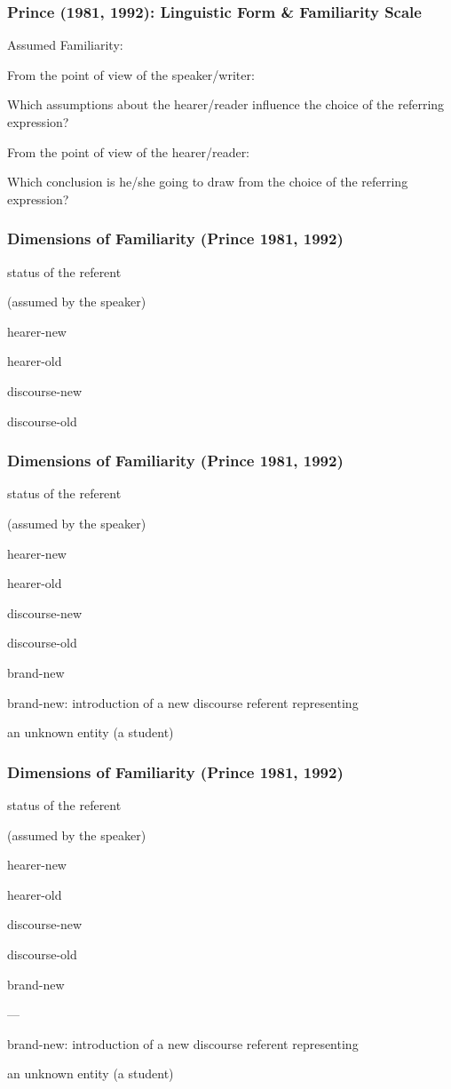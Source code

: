 \documentclass[compress,color=usenames]{beamer}
\begin{document}
\begin{frame}
\frametitle{Prince (1981, 1992): Linguistic Form \& Familiarity Scale}

Assumed Familiarity:

From the point of view of the speaker/writer:

Which assumptions about the hearer/reader inﬂuence the choice of
the referring expression?

From the point of view of the hearer/reader:

Which conclusion is he/she going to draw from the choice of the
referring expression?

\end{frame}

\begin{frame}
\frametitle{Dimensions of Familiarity (Prince 1981, 1992)}

status of the referent

(assumed by the speaker)

hearer-new

hearer-old

discourse-new

discourse-old

\end{frame}

\begin{frame}
\frametitle{Dimensions of Familiarity (Prince 1981, 1992)}

status of the referent

(assumed by the speaker)

hearer-new

hearer-old

discourse-new

discourse-old

brand-new

brand-new: introduction of a new discourse referent representing

an unknown entity (a student)

\end{frame}

\begin{frame}
\frametitle{Dimensions of Familiarity (Prince 1981, 1992)}

status of the referent

(assumed by the speaker)

hearer-new

hearer-old

discourse-new

discourse-old

brand-new

---

brand-new: introduction of a new discourse referent representing

an unknown entity (a student)

\end{frame}
\end{document}

